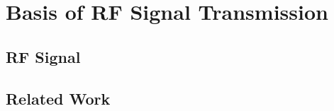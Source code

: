 \chapter{Basis of RF Signal Transmission}
\vspace{-1.4em}


\section{RF Signal}




\section{Related Work}


